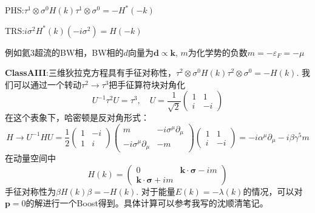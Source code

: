 \documentclass{article}
\numberwithin{equation}{subsection}
\begin{document}
PHS:$\tau^1\otimes\sigma^0H(k)\tau^1\otimes\sigma^0=-H^*(-k)$

TRS:$i\sigma^2H^*(k)(-i\sigma^2)=H(-k)$

例如氦3超流的BW相，BW相的$d$向量为$\bm{d}\propto\bm{k}$, $m$为化学势的负数$m=-\varepsilon_F=-\mu$

\textbf{ClassAIII}:三维狄拉克方程具有手征对称性，$\tau^2\otimes\sigma^0H(k)\tau^2\otimes\sigma^0=-H(k)$. 我们可以通过一个转动$\tau^2\rightarrow\tau^3$把手征算符块对角化
\begin{equation*}
    U^{-1}\tau^2U=\tau^3,\quad U=\frac{1}{\sqrt{2}}\begin{pmatrix}
        1&1\\
        i&-i
    \end{pmatrix}
\end{equation*}
在这个表象下，哈密顿是反对角形式：
\begin{equation*}
    H\rightarrow U^{-1}HU=\frac{1}{2}\begin{pmatrix}
        1&-i\\
        1&i
    \end{pmatrix}\begin{pmatrix}
        m&-i\sigma^\mu\partial_\mu\\
        -i\sigma^\mu\partial_\mu&-m
    \end{pmatrix}\begin{pmatrix}
        1&1\\
        i&-i
    \end{pmatrix}=-i\alpha^\mu\partial_\mu-i\beta\gamma^5m
\end{equation*}
在动量空间中
\begin{equation}
    H(k)=\begin{pmatrix}
        0&\bm{k}\cdot\bm{\sigma}-im\\
        \bm{k}\cdot\bm{\sigma}+im
    \end{pmatrix}
\end{equation}
手征对称性为$\beta H(k)\beta=-H(k)$. 对于能量$E(k)=-\lambda(k)$的情况，可以对$\bm{p}=0$的解进行一个Boost得到。具体计算可以参考我写的沈顺清笔记。
\end{document}
